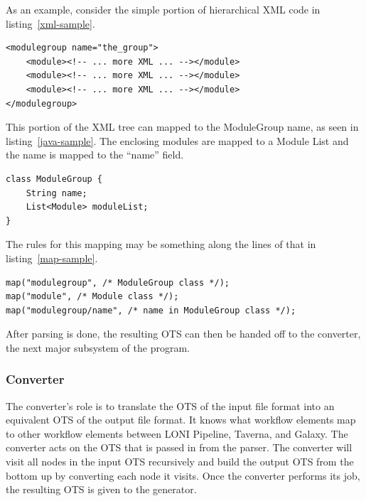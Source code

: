 \documentclass[12pt]{article}
\begin{document}
As an example, consider the simple portion of hierarchical XML code in listing~\ref{xml-sample}.


\noindent
\lstset{language=HTML}
\begin{lstlisting}[frame=single,label=xml-sample,caption=A sample piece of hierarchical XML code.]
<modulegroup name="the_group">
	<module><!-- ... more XML ... --></module>
	<module><!-- ... more XML ... --></module>
	<module><!-- ... more XML ... --></module>
</modulegroup>
\end{lstlisting}

This portion of the XML tree can mapped to the ModuleGroup name, as seen in listing~\ref{java-sample}. The enclosing modules are mapped to a Module List and the name is mapped to the ``name'' field.

\noindent
\lstset{language=Java}
\begin{lstlisting}[frame=single,label=java-sample,caption=Sample class definition for ModuleGroup.]
class ModuleGroup {
	String name;
	List<Module> moduleList;
}
\end{lstlisting}

The rules for this mapping may be something along the lines of that in listing~\ref{map-sample}.
\noindent
\\
\begin{lstlisting}[frame=single,label=map-sample,caption=Sample mapping from XML to Java.]
map("modulegroup", /* ModuleGroup class */);
map("module", /* Module class */);
map("modulegroup/name", /* name in ModuleGroup class */);
\end{lstlisting}

After parsing is done, the resulting OTS can then be handed off to the converter, the next major subsystem of the program.

\subsubsection{Converter}

The converter's role is to translate the OTS of the input file format into an equivalent OTS of the output file format. It knows what workflow elements map to other workflow elements between LONI Pipeline, Taverna, and Galaxy. The converter acts on the OTS that is passed in from the parser. The converter will visit all nodes in the input OTS recursively and build the output OTS from the bottom up by converting each node it visits. Once the converter performs its job, the resulting OTS is given to the generator.
\end{document}
